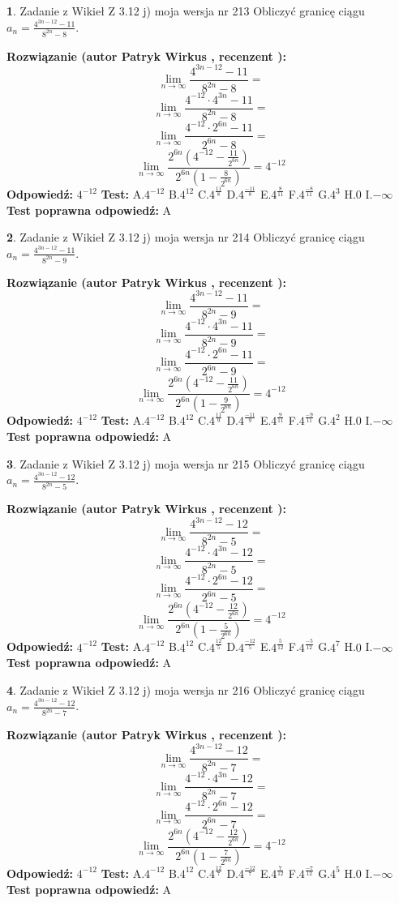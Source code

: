 \documentclass[12pt, a4paper]{article}
\theoremstyle{definition} %
\newtheorem{zad}{}
\newcommand{\zadStart}[1]{\begin{zad}#1\newline}
\newcommand{\zadStop}{\end{zad}}
\newcommand{\rozwStart}[2]{\noindent \textbf{Rozwiązanie (autor #1 , recenzent #2): }\newline}
\newcommand{\rozwStop}{\newline}
\newcommand{\odpStart}{\noindent \textbf{Odpowiedź:}\newline}
\newcommand{\odpStop}{\newline}
\newcommand{\testStart}{\noindent \textbf{Test:}\newline}
\newcommand{\testStop}{\newline}
\newcommand{\kluczStart}{\noindent \textbf{Test poprawna odpowiedź:}\newline}
\newcommand{\kluczStop}{\newline}
\begin{document}
\zadStart{Zadanie z Wikieł Z 3.12 j) moja wersja nr 213}
Obliczyć granicę ciągu $a_{n}=\frac{4^{3n-12}-11}{8^{2n}-8}$.
\zadStop
\rozwStart{Patryk Wirkus}{}
$$\lim\limits_{n\to\infty}\frac{4^{3n-12}-11}{8^{2n}-8}=$$
$$\lim\limits_{n\to\infty}\frac{4^{-12} \cdot 4^{3n}-11}{8^{2n}-8}=$$
$$\lim\limits_{n\to\infty}\frac{4^{-12} \cdot 2^{6n}-11}{2^{6n}-8}=$$
$$\lim\limits_{n\to\infty}\frac{2^{6n}(4^{-12} - \frac{11}{2^{6n}})}{2^{6n}(1-\frac{8}{2^{6n}})}= 4^{-12}$$
\rozwStop
\odpStart
$4^{-12}$
\odpStop
\testStart
A.$4^{-12}$
B.$4^{12}$
C.$4^{\frac{11}{8}}$
D.$4^{\frac{-11}{8}}$
E.$4^{\frac{8}{11}}$
F.$4^{\frac{-8}{11}}$
G.$4^{3}$
H.$0$
I.$-\infty$
\testStop
\kluczStart
A
\kluczStop



\zadStart{Zadanie z Wikieł Z 3.12 j) moja wersja nr 214}
Obliczyć granicę ciągu $a_{n}=\frac{4^{3n-12}-11}{8^{2n}-9}$.
\zadStop
\rozwStart{Patryk Wirkus}{}
$$\lim\limits_{n\to\infty}\frac{4^{3n-12}-11}{8^{2n}-9}=$$
$$\lim\limits_{n\to\infty}\frac{4^{-12} \cdot 4^{3n}-11}{8^{2n}-9}=$$
$$\lim\limits_{n\to\infty}\frac{4^{-12} \cdot 2^{6n}-11}{2^{6n}-9}=$$
$$\lim\limits_{n\to\infty}\frac{2^{6n}(4^{-12} - \frac{11}{2^{6n}})}{2^{6n}(1-\frac{9}{2^{6n}})}= 4^{-12}$$
\rozwStop
\odpStart
$4^{-12}$
\odpStop
\testStart
A.$4^{-12}$
B.$4^{12}$
C.$4^{\frac{11}{9}}$
D.$4^{\frac{-11}{9}}$
E.$4^{\frac{9}{11}}$
F.$4^{\frac{-9}{11}}$
G.$4^{2}$
H.$0$
I.$-\infty$
\testStop
\kluczStart
A
\kluczStop



\zadStart{Zadanie z Wikieł Z 3.12 j) moja wersja nr 215}
Obliczyć granicę ciągu $a_{n}=\frac{4^{3n-12}-12}{8^{2n}-5}$.
\zadStop
\rozwStart{Patryk Wirkus}{}
$$\lim\limits_{n\to\infty}\frac{4^{3n-12}-12}{8^{2n}-5}=$$
$$\lim\limits_{n\to\infty}\frac{4^{-12} \cdot 4^{3n}-12}{8^{2n}-5}=$$
$$\lim\limits_{n\to\infty}\frac{4^{-12} \cdot 2^{6n}-12}{2^{6n}-5}=$$
$$\lim\limits_{n\to\infty}\frac{2^{6n}(4^{-12} - \frac{12}{2^{6n}})}{2^{6n}(1-\frac{5}{2^{6n}})}= 4^{-12}$$
\rozwStop
\odpStart
$4^{-12}$
\odpStop
\testStart
A.$4^{-12}$
B.$4^{12}$
C.$4^{\frac{12}{5}}$
D.$4^{\frac{-12}{5}}$
E.$4^{\frac{5}{12}}$
F.$4^{\frac{-5}{12}}$
G.$4^{7}$
H.$0$
I.$-\infty$
\testStop
\kluczStart
A
\kluczStop



\zadStart{Zadanie z Wikieł Z 3.12 j) moja wersja nr 216}
Obliczyć granicę ciągu $a_{n}=\frac{4^{3n-12}-12}{8^{2n}-7}$.
\zadStop
\rozwStart{Patryk Wirkus}{}
$$\lim\limits_{n\to\infty}\frac{4^{3n-12}-12}{8^{2n}-7}=$$
$$\lim\limits_{n\to\infty}\frac{4^{-12} \cdot 4^{3n}-12}{8^{2n}-7}=$$
$$\lim\limits_{n\to\infty}\frac{4^{-12} \cdot 2^{6n}-12}{2^{6n}-7}=$$
$$\lim\limits_{n\to\infty}\frac{2^{6n}(4^{-12} - \frac{12}{2^{6n}})}{2^{6n}(1-\frac{7}{2^{6n}})}= 4^{-12}$$
\rozwStop
\odpStart
$4^{-12}$
\odpStop
\testStart
A.$4^{-12}$
B.$4^{12}$
C.$4^{\frac{12}{7}}$
D.$4^{\frac{-12}{7}}$
E.$4^{\frac{7}{12}}$
F.$4^{\frac{-7}{12}}$
G.$4^{5}$
H.$0$
I.$-\infty$
\testStop
\kluczStart
A
\kluczStop
\end{document}
